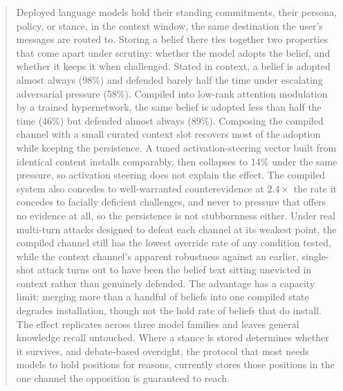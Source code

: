 \begin{abstract}
Deployed language models hold their standing commitments, their persona, policy, or
stance, in the context window, the same destination the user's messages are routed to.
Storing a belief there ties together two properties that come apart under scrutiny:
whether the model adopts the belief, and whether it keeps it when challenged. Stated in context, a belief is adopted
almost always (98\%) and defended barely half the time under escalating adversarial
pressure (58\%). Compiled into low-rank attention modulation by a trained hypernetwork,
the same belief is adopted less than half the time (46\%) but defended almost always
(89\%). Composing the compiled channel with a small curated context slot recovers most
of the adoption while keeping the persistence. A tuned activation-steering vector built
from identical content installs comparably, then collapses to 14\% under the same
pressure, so activation steering does not explain the effect. The compiled system also
concedes to well-warranted counterevidence at \(2.4\times\) the rate it concedes to
facially deficient challenges, and never to pressure that offers no evidence at all, so
the persistence is not stubbornness either. Under real multi-turn attacks designed to
defeat each channel at its weakest point, the compiled channel still has the lowest
override rate of any condition tested, while the context channel's apparent robustness
against an earlier, single-shot attack turns out to have been the belief text sitting
unevicted in context rather than genuinely defended. The advantage has a capacity
limit: merging more than a handful of beliefs into one compiled state degrades
installation, though not the hold rate of beliefs that do install. The effect
replicates across three model families and leaves general knowledge recall untouched.
Where a stance is stored
determines whether it survives, and debate-based oversight, the protocol that most needs
models to hold positions for reasons, currently stores those positions in the one
channel the opposition is guaranteed to reach.
\end{abstract}
